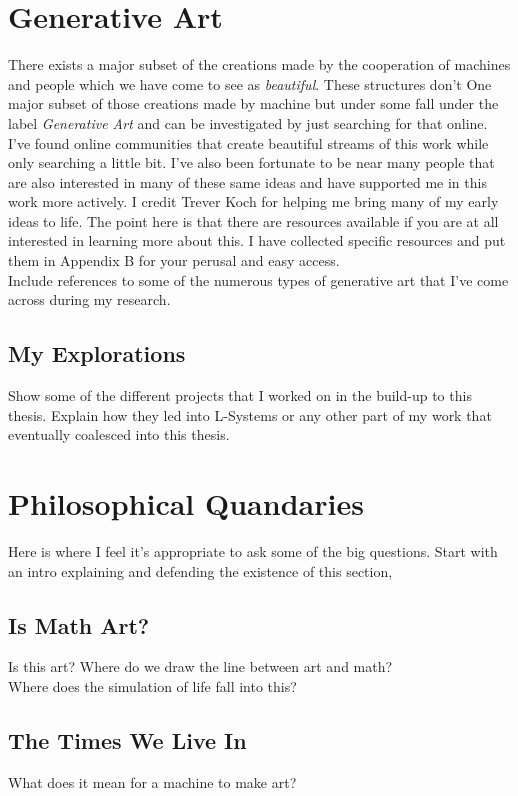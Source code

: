 \documentclass[12pt,twoside]{reedthesis}
\begin{document}
\section{Generative Art}

	There exists a major subset of the creations made by the cooperation of machines and people which we have come to see as \textit{beautiful}. These structures don't 
	One major subset of those creations made by machine but under some fall under the label \textit{Generative Art} and can be investigated by just searching for that online. I've found online communities that create beautiful streams of this work while only searching a little bit. I've also been fortunate to be near many people that are also interested in many of these same ideas and have supported me in this work more actively. I credit Trever Koch for helping me bring many of my early ideas to life. The point here is that there are resources available if you are at all interested in learning more about this. I have collected specific resources and put them in Appendix B for your perusal and easy access.\\
Include references to some of the numerous types of generative art that I've come across during my research. 
\subsection{My Explorations}
Show some of the different projects that I worked on in the build-up to this thesis. Explain how they led into L-Systems or any other part of my work that eventually coalesced into this thesis.\\

\section{Philosophical Quandaries}
Here is where I feel it's appropriate to ask some of the big questions. Start with an intro explaining and defending the existence of this section,\\
\subsection{Is Math Art?}
Is this art? Where do we draw the line between art and math?\\
Where does the simulation of life fall into this?
\subsection{The Times We Live In}
What does it mean for a machine to make art?\\
\end{document}
